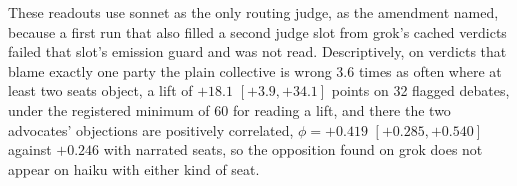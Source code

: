 These readouts use sonnet as the only routing judge, as the amendment named,
because a first run that also filled a second judge slot from grok's cached
verdicts failed that slot's emission guard and was not read.
Descriptively, on verdicts that blame exactly one party the plain collective
is wrong 3.6 times as often where at least two seats object, a lift of
$+18.1$ $[+3.9, +34.1]$ points on 32 flagged debates, under the registered
minimum of 60 for reading a lift, and there the two advocates' objections
are positively correlated, $\phi = +0.419$ $[+0.285, +0.540]$ against
$+0.246$ with narrated seats, so the opposition found on grok does not
appear on haiku with either kind of seat.

